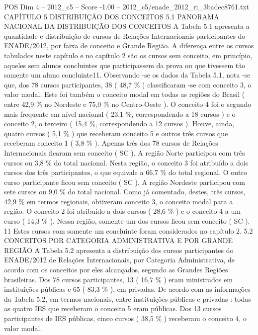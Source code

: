 \begin{textsample}{POS Dim 4 – 2012\_c5 – Score -1.00 – 2012\_c5/enade\_2012\_ri\_3badec8761.txt}  \label{ex:f4_pos_255}
CAPÍTULO 5 DISTRIBUIÇÃO DOS CONCEITOS 5.1 PANORAMA NACIONAL DA DISTRIBUIÇÃO DOS CONCEITOS A Tabela 5.1 apresenta a quantidade e distribuição de cursos de Relações Internacionais participantes do ENADE/2012, por faixa de conceito e Grande Região.
A diferença entre os cursos tabulados neste capítulo e no capítulo 2 são os cursos sem conceito, em princípio, aqueles sem alunos concluintes que participassem da prova ou que tivessem tão somente um aluno concluinte11.
Observando -se os dados da Tabela 5.1, nota -se que, dos 78 cursos participantes, 38 ( 48,7 \% ) classificaram -se com conceito 3, o valor modal.
Este foi também o conceito modal em todas as regiões do Brasil ( entre 42,9 \% no Nordeste e 75,0 \% no Centro-Oeste ).
O conceito 4 foi o segundo mais frequente em nível nacional ( 23,1 \%, correspondendo a 18 cursos ) e o conceito 2, o terceiro ( 15,4 \%, correspondendo a 12 cursos ).
Houve, ainda, quatro cursos ( 5,1 \% ) que receberam conceito 5 e outros três cursos que receberam conceito 1 ( 3,8 \% ).
Apenas três dos 78 cursos de Relações Internacionais ficaram sem conceito ( SC ).
A região Norte participou com três cursos ou 3,8 \% do total nacional.
Nesta região, o conceito 3 foi atribuído a dois cursos dos três participantes, o que equivale a 66,7 \% do total regional.
O outro curso participante ficou sem conceito ( SC ).
A região Nordeste participou com sete cursos ou 9,0 \% do total nacional.
Como já comentado, destes, três cursos, 42,9 \% em termos regionais, obtiveram conceito 3, o conceito modal para a região.
O conceito 2 foi atribuído a dois cursos ( 28,6 \% ) e o conceito 4 a um curso ( 14,3 \% ).
Nessa região, somente um dos cursos ficou sem conceito ( SC ). 11 Estes cursos com somente um concluinte foram considerados no capítulo 2. 5.2 CONCEITOS POR CATEGORIA ADMINISTRATIVA E POR GRANDE REGIÃO A Tabela 5.2 apresenta a distribuição dos cursos participantes do ENADE/2012 de Relações Internacionais, por Categoria Administrativa, de acordo com os conceitos por eles alcançados, segundo as Grandes Regiões brasileiras.
Dos 78 cursos participantes, 13 ( 16,7 \% ) eram ministrados em instituições públicas e 65 ( 83,3 \% ), em privadas.
De acordo com as informações da Tabela 5.2, em termos nacionais, entre instituições públicas e privadas : todas as quatro IES que receberam o conceito 5 eram públicas.
Dos 13 cursos participantes de IES públicas, cinco cursos ( 38,5 \% ) receberam o conceito 4, o valor modal.

\end{textsample}
